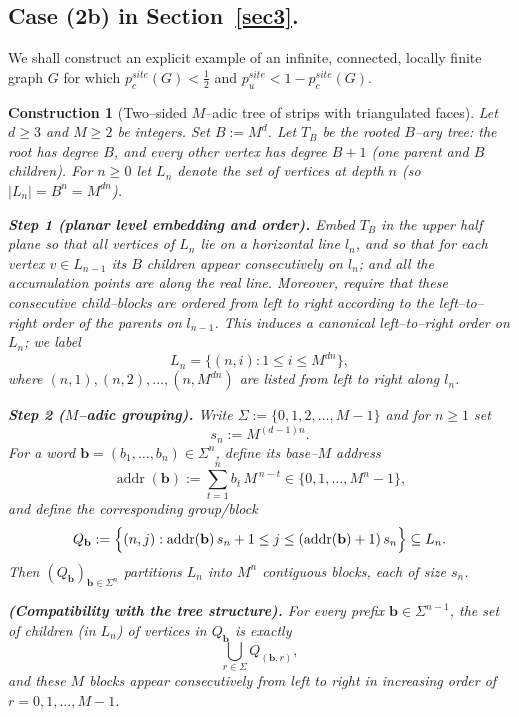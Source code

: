 \documentclass[11pt]{amsart}
\DeclareMathOperator{\addr}{addr}
\theoremstyle{plain}
\newtheorem{construction}[theorem]{Construction}
\numberwithin{equation}{section}
\numberwithin{figure}{section}
\renewcommand\ell{l}
\begin{document}
\subsection{Case (2b) in Section~\ref{sec3}.}

 We shall construct an explicit example of an infinite, connected, locally finite graph $G$ for which $p_c^{site}(G)<\frac{1}{2}$ and $p_u^{site}<1-p_c^{site}(G)$.


\begin{construction}[Two--sided $M$--adic tree of strips with triangulated faces]\label{c75}
Let $d\ge 3$ and $M\geq2$ be integers. Set $B:=M^d$.
Let $T_B$ be the rooted $B$--ary tree: the root has degree $B$, and every other vertex
has degree $B+1$ (one parent and $B$ children). For $n\ge 0$ let $L_n$ denote the set of
vertices at depth $n$ (so $|L_n|=B^n=M^{dn}$).

\smallskip
\noindent\textbf{Step 1 (planar level embedding and order).}
Embed $T_B$ in the upper half plane so that all vertices of $L_n$ lie on a horizontal line $\ell_n$,
and so that for each vertex $v\in L_{n-1}$ its $B$ children appear consecutively on $\ell_n$; and all the accumulation points are along the real line.
Moreover, require that these consecutive child--blocks are ordered from left to right
according to the left--to--right order of the parents on $\ell_{n-1}$.
This induces a canonical left--to--right order on $L_n$; we label
\[
L_n=\{(n,i):1\le i\le M^{dn}\},
\]
where $(n,1),(n,2),\dots,(n,M^{dn})$ are listed from left to right along $\ell_n$.

\smallskip
\noindent\textbf{Step 2 ($M$--adic grouping).}
Write $\Sigma:=\{0,1,2,\ldots,M-1\}$ and for $n\ge 1$ set
\[
s_n:=M^{(d-1)n}.
\]
For a word $\mathbf b=(b_1,\dots,b_n)\in \Sigma^n$, define its base--$M$ address
\[
\addr(\mathbf b):=\sum_{t=1}^n b_t\,M^{\,n-t}\in\{0,1,\dots,M^n-1\},
\]
and define the corresponding \emph{group/block}
\[
Q_{\mathbf b}
:=\Bigl\{(n,j):\addr(\mathbf b)\,s_n+1\le j\le (\addr(\mathbf b)+1)\,s_n\Bigr\}\subseteq L_n.
\]
Then $(Q_{\mathbf b})_{\mathbf b\in\Sigma^n}$ partitions $L_n$ into $M^n$ contiguous blocks,
each of size $s_n$.

\smallskip
\noindent\textbf{(Compatibility with the tree structure).}
For every prefix $\mathbf b\in\Sigma^{n-1}$, the set of children (in $L_n$) of vertices in $Q_{\mathbf b}$
is exactly
\[
\bigcup_{r\in\Sigma} Q_{(\mathbf b,r)},
\]
and these $M$ blocks appear consecutively from left to right in increasing order of $r=0,1,\ldots,M-1$.


\end{construction}
\end{document}
